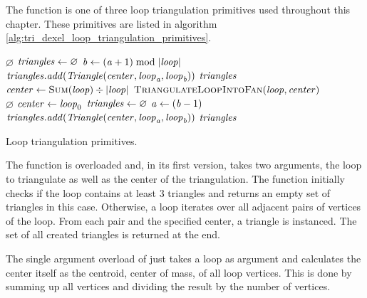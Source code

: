 The  function is one of three loop triangulation primitives used throughout this chapter.
These primitives are listed in algorithm \ref{alg:tri_dexel_loop_triangulation_primitives}.
%
\begin{algorithm}
	\centering
	\begin{algorithmic}[1]
				\State \Return $\varnothing$
			\EndIf
			\State $\mathit{triangles} \gets \varnothing$
				\State $\mathit{b} \gets (\mathit{a} + 1) \bmod |\mathit{loop}|$
				\State $\mathit{triangles}.\mathit{add}(\mathit{Triangle}(\mathit{center}, \mathit{loop}_{\mathit{a}}, \mathit{loop}_{\mathit{b}}))$
			\EndFor
			\State \Return $\mathit{triangles}$
		\EndFunction
		\\
			\State $\var{center} \gets \Call{Sum}{\var{loop}} \div |\var{loop}|$
			\State \Return $\Call{TriangulateLoopIntoFan}{\var{loop}, \var{center}}$
		\EndFunction
		\\
				\State \Return $\varnothing$
			\EndIf
			\State $\mathit{center} \gets \mathit{loop}_0$
			\State $\mathit{triangles} \gets \varnothing$
				\State $\mathit{a} \gets (\mathit{b} - 1)$
				\State $\mathit{triangles}.\mathit{add}(\mathit{Triangle}(\mathit{center}, \mathit{loop}_{\mathit{a}}, \mathit{loop}_{\mathit{b}}))$
			\EndFor
			\State \Return $\mathit{triangles}$
		\EndFunction
	\end{algorithmic}
	\caption{
		Loop triangulation primitives.
	}
	\label{alg:tri_dexel_loop_triangulation_primitives}
\end{algorithm}
%
The  function is overloaded and, in its first version, takes two arguments, the loop to triangulate as well as the center of the triangulation.
The function initially checks if the loop contains at least 3 triangles and returns an empty set of triangles in this case.
Otherwise, a loop iterates over all adjacent pairs of vertices of the loop.
From each pair and the specified center, a triangle is instanced.
The set of all created triangles is returned at the end.

The single argument overload of  just takes a loop as argument and calculates the center itself as the centroid, \ie center of mass, of all loop vertices.
This is done by summing up all vertices and dividing the result by the number of vertices.

